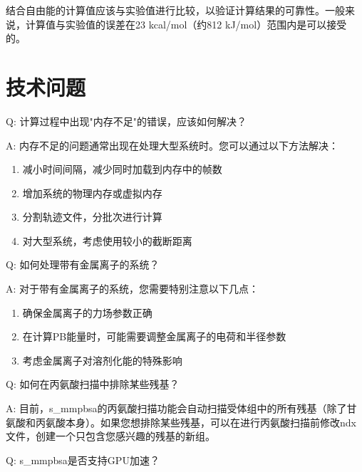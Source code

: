 \documentclass[letterpaper,10pt,english]{sphinxmanual}
\begin{document}
\sphinxAtStartPar
结合自由能的计算值应该与实验值进行比较，以验证计算结果的可靠性。一般来说，计算值与实验值的误差在2\sphinxhyphen{}3 kcal/mol（约8\sphinxhyphen{}12 kJ/mol）范围内是可以接受的。


\section{技术问题}
\label{\detokenize{faq:id4}}
\sphinxAtStartPar
Q: 计算过程中出现"内存不足"的错误，应该如何解决？

\sphinxAtStartPar
A: 内存不足的问题通常出现在处理大型系统时。您可以通过以下方法解决：
\begin{enumerate}
%
\item {} 
\sphinxAtStartPar
减小时间间隔，减少同时加载到内存中的帧数

\item {} 
\sphinxAtStartPar
增加系统的物理内存或虚拟内存

\item {} 
\sphinxAtStartPar
分割轨迹文件，分批次进行计算

\item {} 
\sphinxAtStartPar
对大型系统，考虑使用较小的截断距离

\end{enumerate}

\sphinxAtStartPar
Q: 如何处理带有金属离子的系统？

\sphinxAtStartPar
A: 对于带有金属离子的系统，您需要特别注意以下几点：
\begin{enumerate}
%
\item {} 
\sphinxAtStartPar
确保金属离子的力场参数正确

\item {} 
\sphinxAtStartPar
在计算PB能量时，可能需要调整金属离子的电荷和半径参数

\item {} 
\sphinxAtStartPar
考虑金属离子对溶剂化能的特殊影响

\end{enumerate}

\sphinxAtStartPar
Q: 如何在丙氨酸扫描中排除某些残基？

\sphinxAtStartPar
A: 目前，s\_mmpbsa的丙氨酸扫描功能会自动扫描受体组中的所有残基（除了甘氨酸和丙氨酸本身）。如果您想排除某些残基，可以在进行丙氨酸扫描前修改ndx文件，创建一个只包含您感兴趣的残基的新组。

\sphinxAtStartPar
Q: s\_mmpbsa是否支持GPU加速？
\end{document}
